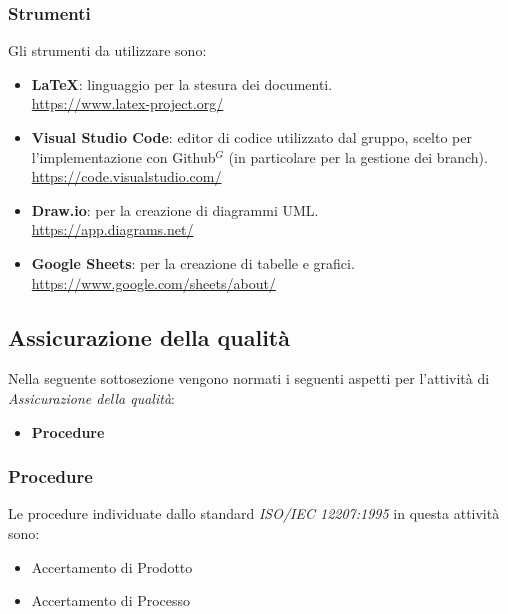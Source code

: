\setlength\extrarowheight{0pt}
\subsubsection{Strumenti}
Gli strumenti da utilizzare sono:
\begin{itemize}
    \item \textbf{\LaTeX}: linguaggio per la stesura dei documenti.\\
    \href{https://www.latex-project.org/}{https://www.latex-project.org/}
    \item \textbf{Visual Studio Code}: editor di codice utilizzato dal gruppo, scelto per \\ l'implementazione con Github$^G$  (in particolare per la gestione dei branch).\\
    \href{https://code.visualstudio.com/}{https://code.visualstudio.com/}
    \item \textbf{Draw.io}: per la creazione di diagrammi UML.\\
    \href{https://app.diagrams.net/}{https://app.diagrams.net/}
    \item \textbf{Google Sheets}: per la creazione di tabelle e grafici.\\
    \href{https://www.google.com/sheets/about/}{https://www.google.com/sheets/about/}
\end{itemize}

\subsection{Assicurazione della qualità}
Nella seguente sottosezione vengono normati i seguenti aspetti per l'attività di \textit{Assicurazione della qualità}:
\begin{itemize}
    \item \textbf{Procedure}
\end{itemize}

\subsubsection{Procedure}
Le procedure individuate dallo standard \textit{ISO/IEC 12207:1995} in questa attività sono:
\begin{itemize}
    \item Accertamento di Prodotto
    \item Accertamento di Processo
\end{itemize}

